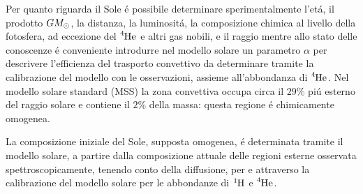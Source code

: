 \documentclass[../main.tex]{subfiles}
\begin{document}
\setlength{\intextsep}{\oldintextsep}

Per quanto riguarda il Sole \'e possibile determinare sperimentalmente l'et\'a, il prodotto $GM_{\odot}$, la distanza, la luminosit\'a, la composizione chimica al livello della fotosfera, ad eccezione del $\cel{He}{4}{}{}$ e altri gas nobili, e il raggio mentre allo stato delle conoscenze \'e conveniente introdurre nel modello solare un parametro $\alpha$ per descrivere l'efficienza del trasporto convettivo da determinare tramite la calibrazione del modello con le osservazioni, assieme all'abbondanza di $\cel{He}{4}{}{}$. Nel modello solare standard (MSS) la zona convettiva occupa circa il $29\%$ pi\'u esterno del raggio solare e contiene il $2\%$ della massa: questa regione \'e chimicamente omogenea.

\begin{wraptable}[15]{r}{0.6\textwidth}

\label{tab:Zhistory}
\end{wraptable}

La composizione iniziale del Sole, supposta omogenea, \'e determinata tramite il modello solare, a partire dalla composizione attuale delle regioni esterne osservata spettroscopicamente, tenendo conto della diffusione, per e attraverso la calibrazione del modello solare per le abbondanze di $\cel{H}{1}{}{}$ e $\cel{He}{4}{}{}$.
\end{document}
